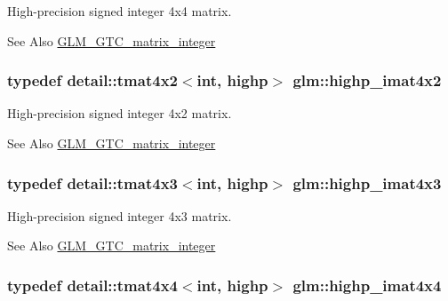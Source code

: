 High-\/precision signed integer 4x4 matrix. \begin{DoxySeeAlso}{See Also}
\hyperlink{group__gtc__matrix__integer}{G\-L\-M\-\_\-\-G\-T\-C\-\_\-matrix\-\_\-integer} 
\end{DoxySeeAlso}
\hypertarget{group__gtc__matrix__integer_gad998dce143f674a95a25241ff6e5e7d2}{
\subsubsection[{highp\-\_\-imat4x2}]{\setlength{\rightskip}{0pt plus 5cm}typedef detail\-::tmat4x2$<$int, highp$>$ {\bf glm\-::highp\-\_\-imat4x2}}}\label{group__gtc__matrix__integer_gad998dce143f674a95a25241ff6e5e7d2}
High-\/precision signed integer 4x2 matrix. \begin{DoxySeeAlso}{See Also}
\hyperlink{group__gtc__matrix__integer}{G\-L\-M\-\_\-\-G\-T\-C\-\_\-matrix\-\_\-integer} 
\end{DoxySeeAlso}
\hypertarget{group__gtc__matrix__integer_ga9d51b6f1c8cd0b23c6fcc8dca924b14c}{
\subsubsection[{highp\-\_\-imat4x3}]{\setlength{\rightskip}{0pt plus 5cm}typedef detail\-::tmat4x3$<$int, highp$>$ {\bf glm\-::highp\-\_\-imat4x3}}}\label{group__gtc__matrix__integer_ga9d51b6f1c8cd0b23c6fcc8dca924b14c}
High-\/precision signed integer 4x3 matrix. \begin{DoxySeeAlso}{See Also}
\hyperlink{group__gtc__matrix__integer}{G\-L\-M\-\_\-\-G\-T\-C\-\_\-matrix\-\_\-integer} 
\end{DoxySeeAlso}
\hypertarget{group__gtc__matrix__integer_ga969c88d5c7530beb80768205a054ee80}{
\subsubsection[{highp\-\_\-imat4x4}]{\setlength{\rightskip}{0pt plus 5cm}typedef detail\-::tmat4x4$<$int, highp$>$ {\bf glm\-::highp\-\_\-imat4x4}}}\label{group__gtc__matrix__integer_ga969c88d5c7530beb80768205a054ee80}
